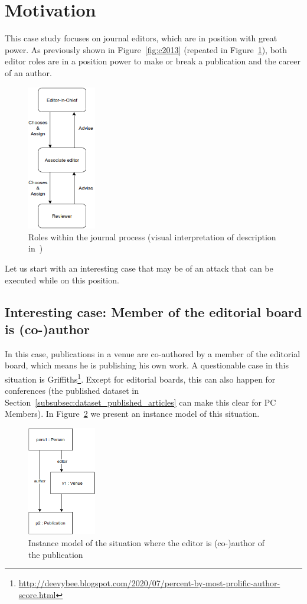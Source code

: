 \documentclass{ou-report}
\begin{document}
\section{Motivation}
This case study focuses on journal editors, which are in position with great 
power. As previously shown in Figure~\ref{fig:c2013} (repeated in Figure~\ref{fig:c2013_2}), both editor roles are in 
a position power to make or break a publication and the career of an author.

\begin{figure}[H]
\centering
\includegraphics[width=3cm]{images/c2013.drawio.png}
\caption{Roles within the journal process (visual interpretation of description in~\cite{C2013})}
\label{fig:c2013_2}
\end{figure}

Let us start with an interesting case that may be of an attack that can be 
executed while on this position.

\subsection{Interesting case: Member of the editorial board is (co-)author}
\label{interesting_case:member_editorial_board_is_coauthor}
In this case, publications in a venue are co-authored by a member of the 
editorial board, which means he is publishing his own work. A questionable 
case in this situation is
\mbox{Griffiths}\footnote{\url{http://deevybee.blogspot.com/2020/07/percent-by-most-prolific-author-score.html}}.
Except for editorial boards, this can also happen for conferences (the published 
dataset in Section~\ref{subsubsec:dataset_published_articles} can make this 
clear for PC Members).
In Figure~\ref{fig:eia} we present an instance model of this situation.
\begin{figure}[H]
\centering
\includegraphics[width=3cm]{images/editor_is_author.drawio.png}
\caption{Instance model of the situation where the editor is (co-)author of 
the publication}
\label{fig:eia}
\end{figure}
\end{document}
